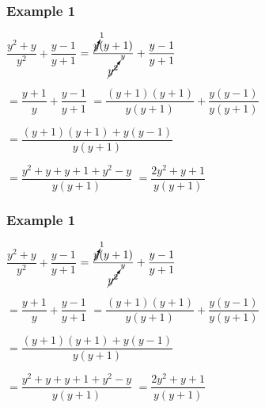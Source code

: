 \documentclass[14pt]{beamer}
\begin{document}
    \begin{frame}
    	\frametitle{Example 1}
    	$\dfrac{y^2+y}{y^2} + \dfrac{y-1}{y+1}$
    	$ = \dfrac{\cancelto{1}{y} (y + 1) }{\cancelto{y}{y^2}} + \dfrac{y-1}{y+1}$
    	
    	\vspace{1em}\hspace{1em} $ = \dfrac{y+1}{y} + \dfrac{y-1}{y+1} $
    	$ = \dfrac{(y+1) (y+1)}{y(y+1)} + \dfrac{y (y - 1)}{y (y + 1)}$
    	
    	\vspace{1em}\hspace{1em} $ = \dfrac{ (y+1)(y+1) + y(y - 1) }{y(y+1)} $
    	
    	\vspace{1em}\hspace{1em} $ = \dfrac{y^2 + y + y + 1 + y^2 -y}{ y(y + 1)} $
    	$ = \dfrac{2y^2 + y + 1}{ y(y + 1)} $
    	
    \end{frame}

    \begin{frame}
    	\frametitle{Example 1}
    	$\dfrac{y^2+y}{y^2} + \dfrac{y-1}{y+1}$
    	$ = \dfrac{\cancelto{1}{y} (y + 1) }{\cancelto{y}{y^2}} + \dfrac{y-1}{y+1}$
    	
    	\vspace{1em}\hspace{1em} $ = \dfrac{y+1}{y} + \dfrac{y-1}{y+1} $
    	$ = \dfrac{(y+1) (y+1)}{y(y+1)} + \dfrac{y (y - 1)}{y (y + 1)}$
    	
    	\vspace{1em}\hspace{1em} $ = \dfrac{ (y+1)(y+1) + y(y - 1) }{y(y+1)} $
    	
    	\vspace{1em}\hspace{1em} $ = \dfrac{y^2 + y + y + 1 + y^2 -y}{ y(y + 1)} $
    	$ = \dfrac{2y^2 + y + 1}{ y(y + 1)} $
    	
    \end{frame}
\end{document}
